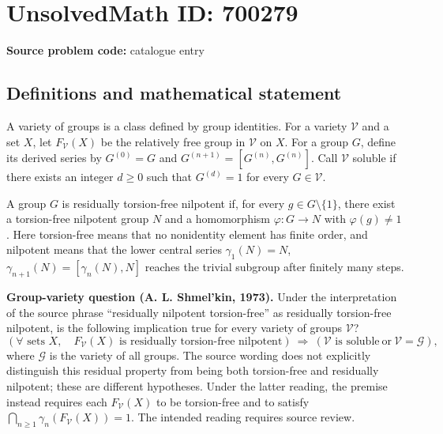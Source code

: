 \documentclass[11pt]{article}
\begin{document}
\section*{UnsolvedMath ID: 700279}
\textbf{Source problem code:} catalogue entry
\subsection{Definitions and mathematical statement}
A variety of groups is a class defined by group identities. For a variety \(\mathcal V\) and a set \(X\), let \(F_{\mathcal V}(X)\) be the relatively free group in \(\mathcal V\) on \(X\). For a group \(G\), define its derived series by \(G^{(0)}=G\) and \(G^{(n+1)}=[G^{(n)},G^{(n)}]\). Call \(\mathcal V\) soluble if there exists an integer \(d\geq 0\) such that \(G^{(d)}=1\) for every \(G\in\mathcal V\).

A group \(G\) is residually torsion-free nilpotent if, for every \(g\in G\setminus\{1\}\), there exist a torsion-free nilpotent group \(N\) and a homomorphism \(\varphi:G\to N\) with \(\varphi(g)\neq 1\). Here torsion-free means that no nonidentity element has finite order, and nilpotent means that the lower central series \(\gamma_1(N)=N\), \(\gamma_{n+1}(N)=[\gamma_n(N),N]\) reaches the trivial subgroup after finitely many steps.

\textbf{Group-variety question (A. L. Shmel'kin, 1973).} Under the interpretation of the source phrase ``residually nilpotent torsion-free'' as residually torsion-free nilpotent, is the following implication true for every variety of groups \(\mathcal V\)?
\[
\left(\forall\text{ sets }X,\quad F_{\mathcal V}(X)\text{ is residually torsion-free nilpotent}\right)
\ \Longrightarrow\ 
\left(\mathcal V\text{ is soluble}\ \text{or}\ \mathcal V=\mathcal G\right),
\]
where \(\mathcal G\) is the variety of all groups. The source wording does not explicitly distinguish this residual property from being both torsion-free and residually nilpotent; these are different hypotheses. Under the latter reading, the premise instead requires each \(F_{\mathcal V}(X)\) to be torsion-free and to satisfy \(\bigcap_{n\geq 1}\gamma_n(F_{\mathcal V}(X))=1\). The intended reading requires source review.
\end{document}
